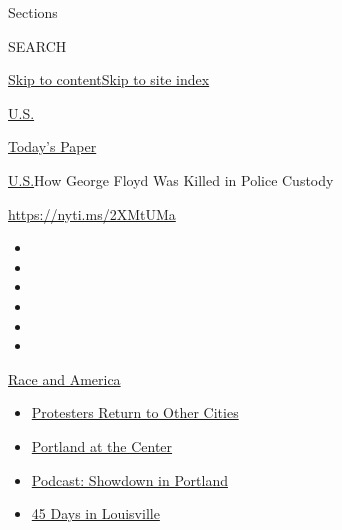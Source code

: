 Sections

SEARCH

\protect\hyperlink{site-content}{Skip to
content}\protect\hyperlink{site-index}{Skip to site index}

\href{https://www.nytimes3xbfgragh.onion/section/us}{U.S.}

\href{https://myaccount.nytimes3xbfgragh.onion/auth/login?response_type=cookie\&client_id=vi}{}

\href{https://www.nytimes3xbfgragh.onion/section/todayspaper}{Today's
Paper}

\href{/section/us}{U.S.}\textbar{}How George Floyd Was Killed in Police
Custody

\url{https://nyti.ms/2XMtUMa}

\begin{itemize}
\item
\item
\item
\item
\item
\item
\end{itemize}

\href{https://www.nytimes3xbfgragh.onion/news-event/george-floyd-protests-minneapolis-new-york-los-angeles?action=click\&pgtype=Article\&state=default\&region=TOP_BANNER\&context=storylines_menu}{Race
and America}

\begin{itemize}
\tightlist
\item
  \href{https://www.nytimes3xbfgragh.onion/2020/07/26/us/protests-portland-seattle-trump.html?action=click\&pgtype=Article\&state=default\&region=TOP_BANNER\&context=storylines_menu}{Protesters
  Return to Other Cities}
\item
  \href{https://www.nytimes3xbfgragh.onion/2020/07/24/us/portland-oregon-protests-white-race.html?action=click\&pgtype=Article\&state=default\&region=TOP_BANNER\&context=storylines_menu}{Portland
  at the Center}
\item
  \href{https://www.nytimes3xbfgragh.onion/2020/07/23/podcasts/the-daily/portland-protests.html?action=click\&pgtype=Article\&state=default\&region=TOP_BANNER\&context=storylines_menu}{Podcast:
  Showdown in Portland}
\item
  \href{https://www.nytimes3xbfgragh.onion/interactive/2020/07/16/us/black-lives-matter-protests-louisville-breonna-taylor.html?action=click\&pgtype=Article\&state=default\&region=TOP_BANNER\&context=storylines_menu}{45
  Days in Louisville}
\end{itemize}

